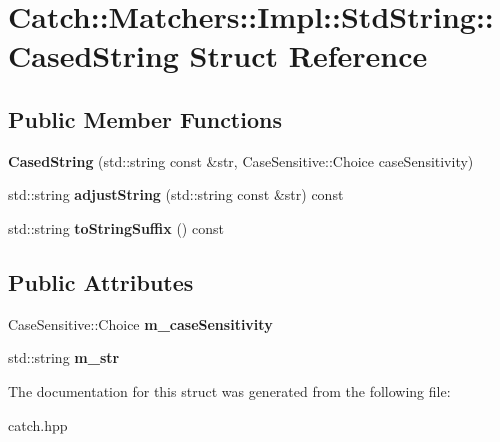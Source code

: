 \hypertarget{structCatch_1_1Matchers_1_1Impl_1_1StdString_1_1CasedString}{}\section{Catch\+:\+:Matchers\+:\+:Impl\+:\+:Std\+String\+:\+:Cased\+String Struct Reference}
\label{structCatch_1_1Matchers_1_1Impl_1_1StdString_1_1CasedString}
\subsection*{Public Member Functions}
\begin{DoxyCompactItemize}
\item 
\mbox{\label{structCatch_1_1Matchers_1_1Impl_1_1StdString_1_1CasedString_aebd017c88423d8a11c62cff85754a22d}} 
{\bfseries Cased\+String} (std\+::string const \&str, Case\+Sensitive\+::\+Choice case\+Sensitivity)
\item 
\mbox{\label{structCatch_1_1Matchers_1_1Impl_1_1StdString_1_1CasedString_a8117fdcee8fd8a8e5001b38e0bd19848}} 
std\+::string {\bfseries adjust\+String} (std\+::string const \&str) const
\item 
\mbox{\label{structCatch_1_1Matchers_1_1Impl_1_1StdString_1_1CasedString_ac12f719f5d1aeb28a2bc2f6cc8b95b37}} 
std\+::string {\bfseries to\+String\+Suffix} () const
\end{DoxyCompactItemize}
\subsection*{Public Attributes}
\begin{DoxyCompactItemize}
\item 
\mbox{\label{structCatch_1_1Matchers_1_1Impl_1_1StdString_1_1CasedString_af399ed93051d8981e298206dee6898b3}} 
Case\+Sensitive\+::\+Choice {\bfseries m\+\_\+case\+Sensitivity}
\item 
\mbox{\label{structCatch_1_1Matchers_1_1Impl_1_1StdString_1_1CasedString_a9f8ce063a934330ac59bf8638f047e99}} 
std\+::string {\bfseries m\+\_\+str}
\end{DoxyCompactItemize}


The documentation for this struct was generated from the following file\+:\begin{DoxyCompactItemize}
\item 
catch.\+hpp\end{DoxyCompactItemize}
